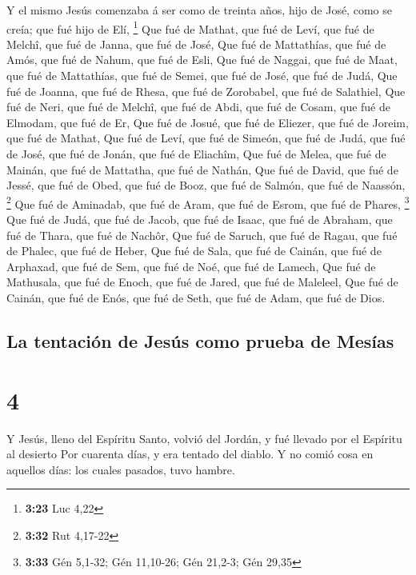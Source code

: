  Y el mismo Jesús comenzaba á ser como de treinta años,
hijo de José, como se creía; que fué hijo de Elí, \footnote{\textbf{3:23}
  Luc 4,22}  Que fué de Mathat, que fué de Leví, que fué
de Melchî, que fué de Janna, que fué de José,  Que fué de
Mattathías, que fué de Amós, que fué de Nahum, que fué de Esli,
 Que fué de Naggai, que fué de Maat, que fué de
Mattathías, que fué de Semei, que fué de José, que fué de Judá,
 Que fué de Joanna, que fué de Rhesa, que fué de
Zorobabel, que fué de Salathiel,  Que fué de Neri, que
fué de Melchî, que fué de Abdi, que fué de Cosam, que fué de Elmodam,
que fué de Er,  Que fué de Josué, que fué de Eliezer, que
fué de Joreim, que fué de Mathat,  Que fué de Leví, que
fué de Simeón, que fué de Judá, que fué de José, que fué de Jonán, que
fué de Eliachîm,  Que fué de Melea, que fué de Mainán,
que fué de Mattatha, que fué de Nathán,  Que fué de
David, que fué de Jessé, que fué de Obed, que fué de Booz, que fué de
Salmón, que fué de Naassón, \footnote{\textbf{3:32} Rut 4,17-22}
 Que fué de Aminadab, que fué de Aram, que fué de Esrom,
que fué de Phares, \footnote{\textbf{3:33} Gén 5,1-32; Gén 11,10-26; Gén
  21,2-3; Gén 29,35}  Que fué de Judá, que fué de Jacob,
que fué de Isaac, que fué de Abraham, que fué de Thara, que fué de
Nachôr,  Que fué de Saruch, que fué de Ragau, que fué de
Phalec, que fué de Heber,  Que fué de Sala, que fué de
Cainán, que fué de Arphaxad, que fué de Sem, que fué de Noé, que fué de
Lamech,  Que fué de Mathusala, que fué de Enoch, que fué
de Jared, que fué de Maleleel,  Que fué de Cainán, que
fué de Enós, que fué de Seth, que fué de Adam, que fué de Dios.

\hypertarget{la-tentaciuxf3n-de-jesuxfas-como-prueba-de-mesuxedas}{%
\subsection{La tentación de Jesús como prueba de
Mesías}\label{la-tentaciuxf3n-de-jesuxfas-como-prueba-de-mesuxedas}}

\hypertarget{section-3}{%
\section{4}\label{section-3}}

 Y Jesús, lleno del Espíritu Santo, volvió del Jordán, y
fué llevado por el Espíritu al desierto  Por cuarenta
días, y era tentado del diablo. Y no comió cosa en aquellos días: los
cuales pasados, tuvo hambre.

